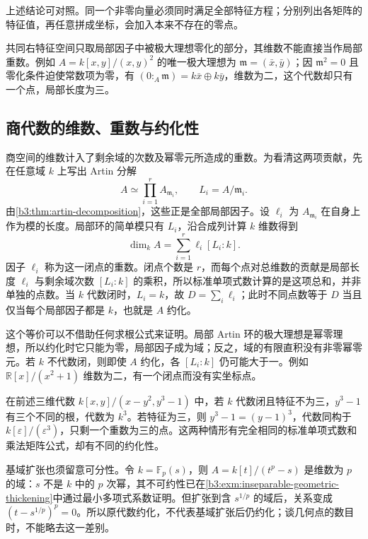 上述结论可对照\cite[Theorem 2.6 and Corollary 2.7, pp. 17--18]{Sturmfels2002PolynomialEquations}。同一个非零向量必须同时满足全部特征方程；分别列出各矩阵的特征值，再任意拼成坐标，会加入本来不存在的零点。

共同右特征空间只取局部因子中被极大理想零化的部分，其维数不能直接当作局部重数。例如 \(A=k[x,y]/(x,y)^2\) 的唯一极大理想为 \(\mathfrak m=(\bar x,\bar y)\)；因 \(\mathfrak m^2=0\) 且零化条件迫使常数项为零，有 \((0:_A\mathfrak m)=k\bar x\oplus k\bar y\)，维数为二，这个代数却只有一个点，局部长度为三。

\subsection{商代数的维数、重数与约化性}
\label{b3:subsec:0805:02}

商空间的维数计入了剩余域的次数及幂零元所造成的重数。为看清这两项贡献，先在任意域 \(k\) 上写出 Artin 分解
\[
	A\simeq\prod_{i=1}^r A_{\mathfrak m_i}, \qquad L_i=A/\mathfrak m_i.
\]
由\cref{b3:thm:artin-decomposition}，这些正是全部局部因子。设 \(\ell_i\) 为 \(A_{\mathfrak m_i}\) 在自身上作为模的长度。局部环的简单模只有 \(L_i\)，沿合成列计算 \(k\) 维数得到
\begin{equation}\label{b3:eq:zero-dimensional-length}
	\dim_k A=\sum_{i=1}^r\ell_i[L_i:k].
\end{equation}
因子 \(\ell_i\) 称为这一闭点的重数。闭点个数是 \(r\)，而每个点对总维数的贡献是局部长度 \(\ell_i\) 与剩余域次数 \([L_i:k]\) 的乘积，所以标准单项式数计算的是这项总和，并非单独的点数。当 \(k\) 代数闭时，\(L_i=k\)，故 \(D=\sum_i\ell_i\)；此时不同点数等于 \(D\) 当且仅当每个局部因子都是 \(k\)，也就是 \(A\) 约化。

\ProseParagraphBreak
这个等价可以不借助任何求根公式来证明。局部 Artin 环的极大理想是幂零理想，所以约化时它只能为零，局部因子成为域；反之，域的有限直积没有非零幂零元。若 \(k\) 不代数闭，则即使 \(A\) 约化，各 \([L_i:k]\) 仍可能大于一。例如 \(\mathbb R[x]/(x^2+1)\) 维数为二，有一个闭点而没有实坐标点。

\ProseParagraphBreak
在前述三维代数 \(k[x,y]/(x-y^2,y^3-1)\) 中，若 \(k\) 代数闭且特征不为三，\(y^3-1\) 有三个不同的根，代数为 \(k^3\)。若特征为三，则 \(y^3-1=(y-1)^3\)，代数同构于 \(k[\varepsilon]/(\varepsilon^3)\)，只剩一个重数为三的点。这两种情形有完全相同的标准单项式数和乘法矩阵公式，却有不同的约化性。

\ProseParagraphBreak
基域扩张也须留意可分性。令 \(k=\mathbb F_p(s)\)，则 \(A=k[t]/(t^p-s)\) 是维数为 \(p\) 的域：\(s\) 不是 \(k\) 中的 \(p\) 次幂，其不可约性已在\cref{b3:exm:inseparable-geometric-thickening}中通过最小多项式系数证明。但扩张到含 \(s^{1/p}\) 的域后，关系变成 \((t-s^{1/p})^p=0\)。所以原代数约化，不代表基域扩张后仍约化；谈几何点的数目时，不能略去这一差别。

